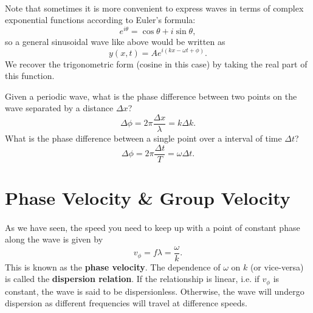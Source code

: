 \documentclass[../classical_mechanics.tex]{subfiles}
\begin{document}
        \paragraph{}
        Note that sometimes it is more convenient to express waves in terms of complex exponential functions according to Euler's formula:
        \begin{equation}
            e^{i\theta}=\cos\theta+i\sin\theta,
        \end{equation}
        so a general sinusoidal wave like above would be written as
        \begin{equation}
            y(x,t)=Ae^{i(kx-\omega t+\phi)}.
        \end{equation}
        We recover the trigonometric form (cosine in this case) by taking the real part of this function.
        \begin{example}
            Given a periodic wave, what is the phase difference between two points on the wave separated by a distance $\Delta x$?
            \begin{equation}
                \Delta\phi=2\pi\frac{\Delta x}{\lambda}=k\Delta k.
            \end{equation}
            What is the phase difference between a single point over a interval of time $\Delta t$?
            \begin{equation}
                \Delta\phi=2\pi\frac{\Delta t}{T}=\omega\Delta t.
            \end{equation}
        \end{example}

    \section{Phase Velocity \& Group Velocity}
        \paragraph{}
        As we have seen, the speed you need to keep up with a point of constant phase along the wave is given by
        \begin{equation}
            v_\phi=f\lambda=\frac{\omega}{k}.
        \end{equation}
        This is known as the \textbf{phase velocity}.
        The dependence of $\omega$ on $k$ (or vice-versa) is called the \textbf{dispersion relation}.
        If the relationship is linear, i.e. if $v_\phi$ is constant, the wave is said to be dispersionless.
        Otherwise, the wave will undergo dispersion as different frequencies will travel at difference speeds.
\end{document}
